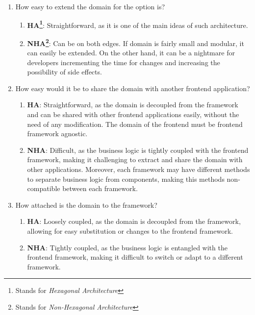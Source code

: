 \documentclass[../design.tex]{subfiles}
\begin{document}
\begin{enumerate}
	\item How easy to extend the domain for the option is?
	      \begin{enumerate}[label = -]
		      \item\textbf{HA\footnote{Stands for \emph{Hexagonal
					      Architecture}}}: Straightforward, as it is one of the main ideas
		      of such architecture.
		      \item\textbf{NHA\footnote{Stands for \emph{Non-Hexagonal
					      Architecture}}}: Can be on both edges. If domain is
		      fairly small and modular, it can easily be extended. On the other
		      hand, it can be a nightmare for developers incrementing the time
		      for changes and increasing the possibility of side effects.
	      \end{enumerate}
	\item How easy would it be to share the domain with another frontend
	      application?
	      \begin{enumerate}[label=-]
		      \item \textbf{HA}: Straightforward, as the domain is decoupled from the
		            framework and can be shared with other frontend applications
		            easily, without the need of any modification. The domain of
		            the frontend must be frontend framework agnostic.
		      \item \textbf{NHA}: Difficult, as the business logic is tightly coupled
		            with the frontend framework, making it challenging to extract and
		            share the domain with other applications. Moreover, each
		            framework may have different methods to separate business
		            logic from components, making this methods non-compatible
		            between each framework.
	      \end{enumerate}
	\item How attached is the domain to the framework?
	      \begin{enumerate}[label=-]
		      \item \textbf{HA}: Loosely coupled, as the domain is decoupled from the
		            framework, allowing for easy substitution or changes to the
		            frontend framework.
		      \item \textbf{NHA}: Tightly coupled, as the business logic is entangled
		            with the frontend framework, making it difficult to switch or adapt
		            to a different framework.
	      \end{enumerate}

\end{enumerate}
\end{document}
